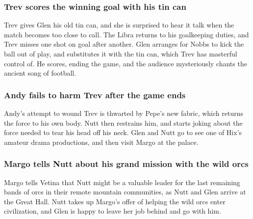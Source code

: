 \subsubsection{\Gls{Trev} scores the winning goal with his tin can}
\Gls{Trev} gives \Gls{Glen} his old tin can, and she is surprised to hear it talk when the match
becomes too close to call. The \Gls{Libra} returns to his goalkeeping duties, and \Gls{Trev} misses
one shot on goal after another. \Gls{Glen} arranges for \Gls{Nobbs} to kick the ball out of play,
and substitutes it with the tin can, which \Gls{Trev} has masterful control of. He scores, ending
the game, and the audience mysteriously chants the ancient song of football.

\subsubsection{\Gls{Andy} fails to harm \Gls{Trev} after the game ends}
\Gls{Andy}'s attempt to wound \Gls{Trev} is thwarted by \Gls{Pepe}'s new fabric, which returns the
force to his own body. \Gls{Nutt} then restrains him, and starts joking about the force needed to
tear his head off his neck. \Gls{Glen} and \Gls{Nutt} go to see one of \Gls{Hix}'s amateur drama
productions, and then visit \Gls{Margo} at the palace.

\subsubsection{\Gls{Margo} tells \Gls{Nutt} about his grand mission with the wild orcs}
\Gls{Margo} tells \Gls{Vetina} that \Gls{Nutt} might be a valuable leader for the last remaining
bands of orcs in their remote mountain communities, as \Gls{Nutt} and \Gls{Glen} arrive at the
Great Hall. \Gls{Nutt} takes up \Gls{Margo}'s offer of helping the wild orcs enter civilization, and
\Gls{Glen} is happy to leave her job behind and go with him.

